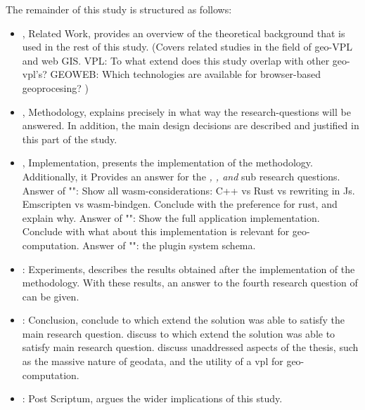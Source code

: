 The remainder of this study is structured as follows:
\begin{itemize}[ ]
  \item {}, Related Work, provides an overview of the theoretical background that is used in the rest of this study. (Covers related studies in the field of geo-VPL and web GIS. VPL: To what extend does this study overlap with other geo-vpl's? GEOWEB: Which technologies are available for browser-based geoprocesing? )

  \item {}, Methodology, explains precisely in what way the research-questions will be answered. In addition, the main design decisions are described and justified in this part of the study.

  \item {}, Implementation, presents the implementation of the methodology. Additionally, it Provides an answer for the \textit{\mySubRQOneTitle, \mySubRQTwoTitle , and \mySubRQThreeTitle} sub research questions. 
  \subitem Answer of "\mySubRQOneTitle": Show all wasm-considerations: C++ vs Rust vs rewriting in Js. Emscripten vs wasm-bindgen. Conclude with the preference for rust, and explain why.
  \subitem Answer of "\mySubRQTwoTitle": Show the full application implementation. Conclude with what about this implementation is relevant for geo-computation. 
  \subitem Answer of "\mySubRQThreeTitle": the plugin system schema. 
  
  \item {}: Experiments, describes the results obtained after the implementation of the methodology. With these results, an answer to the fourth research question of \mySubRQFourTitle can be given. 

  \item {}: Conclusion, 
  \subitem conclude to which extend the solution was able to satisfy the main research question. 
  \subitem discuss to which extend the solution was able to satisfy main research question.
  \subitem discuss unaddressed aspects of the thesis, such as the massive nature of geodata, and the utility of a vpl for geo-computation.

  \item {}: Post Scriptum, argues the wider implications of this study. 

\end{itemize}
